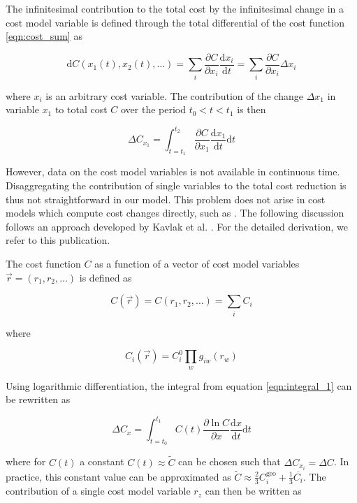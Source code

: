 \documentclass[10pt]{article}
\begin{document}
The infinitesimal contribution to the total cost by the infinitesimal change in a cost model variable is defined through the total differential of the cost function \cref{eqn:cost_sum} as

\begin{equation}
\text{d}C(x_1 (t), x_2(t), \dots) = \sum_i \frac{\partial C }{\partial x_i}     \frac{\text{d}x_i}{\text{d}t} = \sum_i \frac{\partial C }{\partial x_i}  \Delta x_i
\end{equation}

where $x_i$ is an arbitrary cost variable. The contribution of the change $\Delta x_1$ in variable $x_1$ to total cost $C$ over the period $t_0 < t < t_1 $ is then

\begin{equation}
\Delta C_{x_1} = \int_{t=t_1}^{t_2} \frac{\partial C }{\partial x_1} \frac{\text{d}x_1}{\text{d}t} \text{d}t
\label{eqn:integral_1}
\end{equation}

However, data on the cost model variables is not available in continuous time. Disaggregating the contribution of single variables to the total cost reduction is thus not straightforward in our model. This problem does not arise in cost models which compute cost changes directly, such as \cite{nemet2012solar} \cite{goodrich2013assessing}. The following discussion follows an approach developed by Kavlak et al. \cite{kavlak2018evaluating}. For the detailed derivation, we refer to this publication.

The cost function $C$ as a function of a vector of cost model variables $\vec{r}=(r_1,r_2,\dots)$ is defined as

\begin{equation}
C(\vec{r}) = C(r_1,r_2, \dots) = \sum_i C_i
\end{equation}

where

\begin{equation}
C_i(\vec{r}) = C_i^0 \prod_w g_{iw}(r_w)
\end{equation}

Using logarithmic differentiation, the integral from equation \cref{eqn:integral_1} can be rewritten as

\begin{equation}
\Delta C_x = \int_{t=t_0}^{t_1} C(t) \frac{ \partial \ln C }{ \partial x } \frac{ \text{d} x }{ \text{d} t} \text{d} t
\end{equation}

where for $C(t)$ a constant $C(t) \approx \tilde{C} $ can be chosen such that $\Delta C_{x_i} = \Delta C$. In practice, this constant value can be approximated as $\tilde{C} \approx \frac{2}{3} C_i^\text{geo} + \frac{1}{3} \overline{C_i}$. The contribution of a single cost model variable $r_z$ can then be written as
\end{document}
